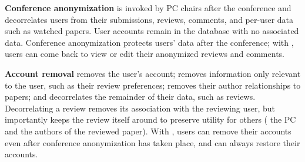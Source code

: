 %
\textbf{Conference anonymization} is invoked by PC chairs after the conference
and decorrelates users from their submissions, reviews, comments, and
per-user data such as watched papers.
%
User accounts remain in the database with no associated data.
%
Conference anonymization protects users' data after the conference; with \sys,
users can come back to view or edit their anonymized reviews and comments.
%

\textbf{Account removal} \one{} removes the user's account; \two{} removes
information only relevant to the user, such as their review preferences;
\three{} removes their author relationships to papers; and \four{} decorrelates
the remainder of their data, such as reviews. %
%
Decorrelating a review removes its association with the reviewing user, but
importantly keeps the review itself around to preserve utility for others (\eg
the PC and the authors of the reviewed paper).
%
%
%
%
With \sys, users can remove their accounts even after conference anonymization has taken
place, and can always restore their accounts.%
%

